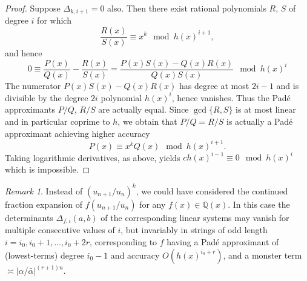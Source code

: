 \documentclass{article}
\numberwithin{equation}{section}
\theoremstyle{definition}
\theoremstyle{remark}
\newtheorem{rem}[thm]{Remark}
\newcommand{\QQ}{\mathbb{Q}}
\newcommand{\<}{\left\langle}
\renewcommand{\>}{\right\rangle}
\begin{document}
\begin{proof}
  Suppose $\Delta_{k,i+1} = 0$ also. Then there exist rational polynomials $R$, $S$ of degree $i$ for which
  \begin{equation*}
    \frac{R(x)}{S(x)} \equiv x^k \mod h(x)^{i+1},
  \end{equation*}
  and hence
  \begin{equation*}
    0 \equiv \frac{P(x)}{Q(x)} - \frac{R(x)}{S(x)} = \frac{P(x) S(x) - Q(x) R(x)}{Q(x) S(x)} \mod h(x)^i
  \end{equation*}
  The numerator $P(x) S(x) - Q(x) R(x)$ has degree at most $2i - 1$ and is divisible by the degree $2i$ polynomial $h(x)^i$, hence vanishes. Thus the Pad\'e approximants $P/Q$, $R/S$ are actually equal. Since $\gcd\{R,S\}$ is at most linear and in particular coprime to $h$, we obtain that $P/Q = R/S$ is actually a Pad\'e approximant achieving higher accuracy
  \begin{equation*}
    P(x) \equiv x^k Q(x) \mod h(x)^{i+1}.
  \end{equation*}
  Taking logarithmic derivatives, as above, yields $c h(x)^{i-1} \equiv 0 \mod h(x)^i$ which is impossible.
\end{proof}

\begin{rem}
  Instead of $(u_{n+1}/u_n)^k$, we could have considered the continued fraction expansion of $f(u_{n+1}/u_n)$ for any $f(x) \in \QQ(x)$. In this case the determinants $\Delta_{f,i}(a,b)$ of the corresponding linear systems may vanish for multiple consecutive values of $i$, but invariably in strings of odd length $i = i_0, i_0 + 1,\ldots, i_0 + 2r$, corresponding to $f$ having a Pad\'e approximant of (lowest-terms) degree $i_0 - 1$ and accuracy $O(h(x)^{i_0 + r})$, and a monster term $\asymp \lvert\alpha/\bar\alpha\rvert^{(r + 1)n}$.
\end{rem}
\end{document}
